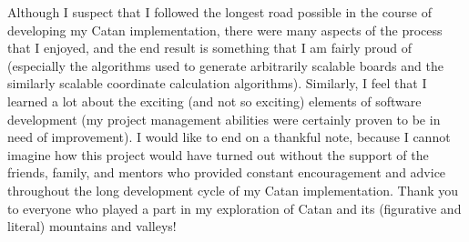 \documentclass[pageno]{jpaper}
\begin{document}
\begin{doublespacing}
Although I suspect that I followed the longest road possible in the course of developing my Catan implementation, there were many aspects of the process that I enjoyed, and the end result is something that I am fairly proud of (especially the algorithms used to generate arbitrarily scalable boards and the similarly scalable coordinate calculation algorithms). Similarly, I feel that I learned a lot about the exciting (and not so exciting) elements of software development (my project management abilities were certainly proven to be in need of improvement). I would like to end on a thankful note, because I cannot imagine how this project would have turned out without the support of the friends, family, and mentors who provided constant encouragement and advice throughout the long development cycle of my Catan implementation. Thank you to everyone who played a part in my exploration of Catan and its (figurative and literal) mountains and valleys!

\end{doublespacing} 


\end{document}
